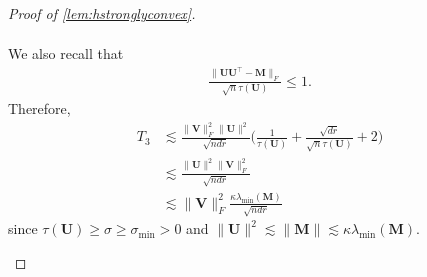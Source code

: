 \documentclass[10pt]{article}
\renewcommand{\t}{^{\top}}
\theoremstyle{definition}
\begin{document}
\begin{proof}[Proof of \cref{lem:hstronglyconvex}]
\begin{itemize}
\begin{align}
\end{align}
We also recall that 
\begin{align}
    \frac{ \| \bm{UU}\t - \bm{M}\|_F}{\sqrt{n} \tau(\bm{U})} \leq 1.
\end{align}
Therefore,
\begin{align}
    T_3 &\lesssim \frac{\| \bm{V}\|_F^2 \| \bm{U}\|^2}{\sqrt{ndr}} \bigg( \frac{1}{\tau(\bm{U})} + \frac{\sqrt{dr}}{\sqrt{n} \tau(\bm{U})} + 2 \bigg) \\
    &\lesssim \frac{\|\bm{U}\|^2 \|\bm{V}\|_F^2}{\sqrt{ndr}} \\
    &\lesssim \|\bm{V}\|_F^2 \frac{\kappa \lambda_{\min}(\bm{M})}{\sqrt{ndr}}
\end{align}
since $\tau(\bm{U}) \geq \sigma \geq \sigma_{\min} > 0$ and $\|\bm{U}\|^2 \lesssim \| \bm{M}\| \lesssim \kappa \lambda_{\min}(\bm{M})$.  


\end{itemize}
\end{proof}
\end{document}
